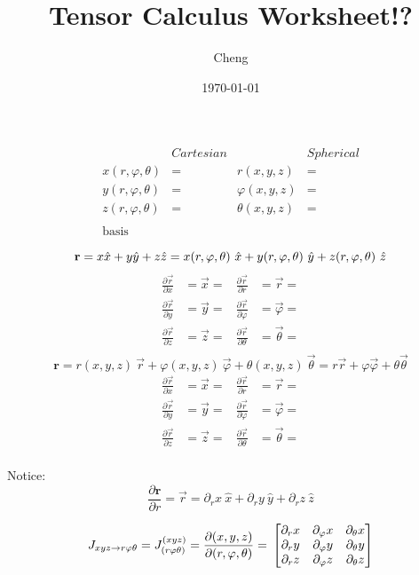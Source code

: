 \documentclass{article} %
\title{Tensor Calculus Worksheet!?} %
\author{Cheng} %
\date{\today} %
\begin{document}
\maketitle %

\begin{align*}
&Cartesian                      &               &Spherical\\
x(r, \varphi, \theta)&=           &r(x,y,z)&=\\
y(r, \varphi, \theta)&=           &\varphi(x,y,z)&=\\
z(r, \varphi, \theta)&=           &\theta(x,y,z)&=\\
\\
\text{basis}\\
\end{align*}
$$\mathbf{r} = x\hat{x} + y\hat{y} +z\hat{z}  
= x(r, \varphi, \theta)\ \hat{x} +y(r, \varphi, \theta)\ \hat{y} +z(r, \varphi, \theta)\ \hat{z}\\$$
\begin{align*}
\frac{\partial \vec{r}}{\partial x}&=\vec{x}=     &\frac{\partial \vec{r}}{\partial r}&=\vec{r}=\\
\frac{\partial \vec{r}}{\partial y}&=\vec{y}=     &\frac{\partial \vec{r}}{\partial \varphi}&=\vec{\varphi}=\\
\frac{\partial \vec{r}}{\partial z}&=\vec{z}=     &\frac{\partial \vec{r}}{\partial \theta}&=\vec{\theta}=\\
\end{align*}
$$\mathbf{r} = r(x,y,z)\ \vec{r} + \varphi(x,y,z)\ \vec{\varphi} + \theta(x,y,z)\ \vec{\theta}
=r\vec{r} + \varphi \vec{\varphi} + \theta \vec{\theta}$$
\begin{align*}
\frac{\partial \vec{r}}{\partial x}&=\vec{x}=     &\frac{\partial \vec{r}}{\partial r}&=\vec{r}=\\
\frac{\partial \vec{r}}{\partial y}&=\vec{y}=     &\frac{\partial \vec{r}}{\partial \varphi}&=\vec{\varphi}=\\
\frac{\partial \vec{r}}{\partial z}&=\vec{z}=     &\frac{\partial \vec{r}}{\partial \theta}&=\vec{\theta}=\\
\end{align*}

Notice:
$$\frac{\partial \mathbf{r}}{\partial r} = \vec{r} = \partial_r x \ \hat{x} + \partial_r y \ \hat{y} + \partial_r z \ \hat{z}$$

\[
J_{xyz \rightarrow r \varphi \theta} = J^{(xyz)}_{(r\varphi\theta)}=
\frac{\partial(x,y,z)}{\partial(r, \varphi, \theta)} =\\
\begin{bmatrix}
\partial_r x & \partial_{\varphi} x & \partial_{\theta} x\\
\partial_r y & \partial_{\varphi} y & \partial_{\theta} y\\
\partial_r z & \partial_{\varphi} z & \partial_{\theta} z\\
\end{bmatrix}
\]
\end{document}

